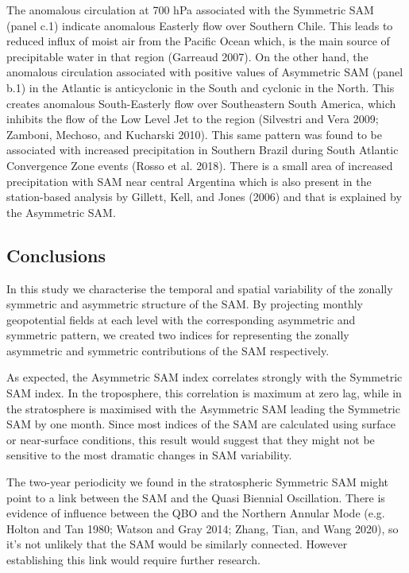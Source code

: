 \documentclass[smallextended]{svjour3}       %
\begin{document}
The anomalous circulation at 700 hPa associated with the Symmetric SAM (panel c.1) indicate anomalous Easterly flow over Southern Chile. This leads to reduced influx of moist air from the Pacific Ocean which, is the main source of precipitable water in that region (Garreaud 2007). On the other hand, the anomalous circulation associated with positive values of Asymmetric SAM (panel b.1) in the Atlantic is anticyclonic in the South and cyclonic in the North. This creates anomalous South-Easterly flow over Southeastern South America, which inhibits the flow of the Low Level Jet to the region (Silvestri and Vera 2009; Zamboni, Mechoso, and Kucharski 2010). This same pattern was found to be associated with increased precipitation in Southern Brazil during South Atlantic Convergence Zone events (Rosso et al. 2018). There is a small area of increased precipitation with SAM near central Argentina which is also present in the station-based analysis by Gillett, Kell, and Jones (2006) and that is explained by the Asymmetric SAM.

\hypertarget{conclusions}{%
\subsection{Conclusions}\label{conclusions}}

In this study we characterise the temporal and spatial variability of the zonally symmetric and asymmetric structure of the SAM. By projecting monthly geopotential fields at each level with the corresponding asymmetric and symmetric pattern, we created two indices for representing the zonally asymmetric and symmetric contributions of the SAM respectively.

As expected, the Asymmetric SAM index correlates strongly with the Symmetric SAM index. In the troposphere, this correlation is maximum at zero lag, while in the stratosphere is maximised with the Asymmetric SAM leading the Symmetric SAM by one month. Since most indices of the SAM are calculated using surface or near-surface conditions, this result would suggest that they might not be sensitive to the most dramatic changes in SAM variability.

The two-year periodicity we found in the stratospheric Symmetric SAM might point to a link between the SAM and the Quasi Biennial Oscillation. There is evidence of influence between the QBO and the Northern Annular Mode (e.g. Holton and Tan 1980; Watson and Gray 2014; Zhang, Tian, and Wang 2020), so it's not unlikely that the SAM would be similarly connected. However establishing this link would require further research.
\end{document}
